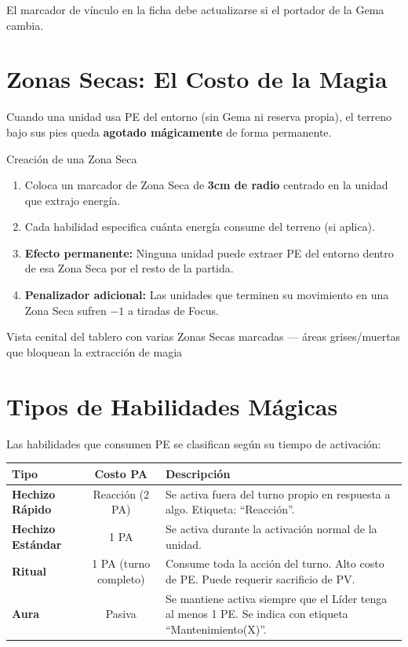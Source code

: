 El marcador de vínculo en la ficha debe actualizarse si el portador de la Gema cambia.

\section{Zonas Secas: El Costo de la Magia}

Cuando una unidad usa PE del entorno (sin Gema ni reserva propia), el terreno bajo sus pies queda \textbf{agotado mágicamente} de forma permanente.

\begin{reglaespecial}{Creación de una Zona Seca}
\begin{enumerate}
    \item Coloca un marcador de Zona Seca de \textbf{3cm de radio} centrado en la unidad que extrajo energía.
    \item Cada habilidad especifica cuánta energía consume del terreno (si aplica).
    \item \textbf{Efecto permanente:} Ninguna unidad puede extraer PE del entorno dentro de esa Zona Seca por el resto de la partida.
    \item \textbf{Penalizador adicional:} Las unidades que terminen su movimiento en una Zona Seca sufren $-1$ a tiradas de Focus.
\end{enumerate}
\end{reglaespecial}

\begin{imagebox}{Vista cenital del tablero con varias Zonas Secas marcadas — áreas grises/muertas que bloquean la extracción de magia}
    \vspace{2.5cm}
\end{imagebox}

\section{Tipos de Habilidades Mágicas}

Las habilidades que consumen PE se clasifican según su tiempo de activación:

\begin{tabularx}{\linewidth}{|l|c|X|}
\hline
\rowcolor{GoldRule!20} \textbf{Tipo} & \textbf{Costo PA} & \textbf{Descripción} \\ \hline
\textbf{Hechizo Rápido} & Reacción (2 PA) & Se activa fuera del turno propio en respuesta a algo. Etiqueta: ``Reacción''. \\ \hline
\textbf{Hechizo Estándar} & 1 PA & Se activa durante la activación normal de la unidad. \\ \hline
\textbf{Ritual} & 1 PA (turno completo) & Consume toda la acción del turno. Alto costo de PE. Puede requerir sacrificio de PV. \\ \hline
\textbf{Aura} & Pasiva & Se mantiene activa siempre que el Líder tenga al menos 1 PE. Se indica con etiqueta ``Mantenimiento(X)''. \\ \hline
\end{tabularx}

